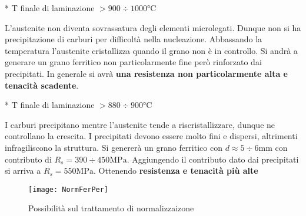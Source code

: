 \setlength{\columnsep}{35pt}
\begin{multicols}{2}
\begin{definition}{}{*}
T finale di laminazione $> 900 \div 1000\unit{\celsius}$
\end{definition}
L'austenite non diventa sovrassatura degli elementi microlegati.
Dunque non si ha precipitazione di carburi per difficoltà nella
nucleazione. Abbassando la temperatura l'austenite cristallizza quando
il grano non è in controllo. Si andrà a generare un grano ferritico non 
particolarmente fine però rinforzato dai precipitati.
In generale si avrà \textbf{una resistenza non particolarmente alta e
tenacità scadente}.
\columnbreak
\begin{definition}{}{*}
T finale di laminazione $> 880 \div 900\unit{\celsius}$
\end{definition}
I carburi precipitano mentre l'austenite tende a riscristallizzare, dunque
ne controllano la crescita.
I precipitati devono essere molto fini e dispersi, altrimenti 
infragiliscono la struttura.
Si genererà un grano ferritico con $d \approx 5 \div 6\unit{\mm}$ con 
contributo di $R_s = 390\div450\unit{\MPa}$.
Aggiungendo il contributo dato dai precipitati si arriva a $R_s = 
550\unit{\MPa}$. Ottenendo \textbf{resistenza e tenacità più alte}
\end{multicols}

\begin{figure}
\centering
\texttt{[image: NormFerPer]}
\caption{Possibilità sul trattamento di normalizzaizone}
\label{fig:NormFerPer}
\end{figure}

